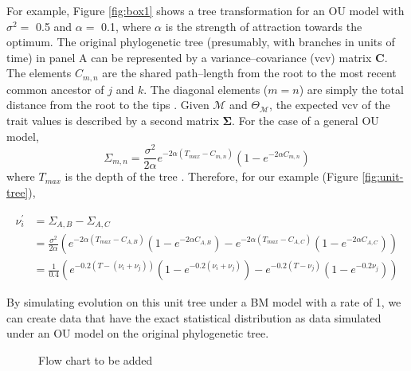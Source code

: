 \documentclass[a4paper,12pt]{article}
\begin{document}
For example, Figure \ref{fig:box1} shows a tree transformation for an OU model with $\sigma^2=$ 0.5 and $\alpha =$ 0.1, where $\alpha$ is the strength of attraction towards the optimum. The original phylogenetic tree (presumably, with branches in units of time) in panel A can be represented by a variance--covariance (vcv) matrix $\mathbf{C}$. The elements $C_{m,n}$ are the shared path--length from the root to the most recent common ancestor of $j$ and $k$. The diagonal elements ($m = n$) are simply the total distance from the root to the tips \citep{Omeara2006}. Given $\mathcal{M}$ and $\Theta_{\mathcal{M}}$, the expected vcv of the trait values is described by a second matrix $\mathbf{\Sigma}$. For the case of a general OU model,
\begin{equation}
\Sigma_{m,n} = \frac{\sigma^2}{2\alpha} e^{-2\alpha (T_{max} - C_{m,n})} (1 - e^{-2\alpha C_{m,n}})
\end{equation} 
where $T_{max}$ is the depth of the tree \citep{Hansen1997, ButlerKing2004}. Therefore, for our example (Figure \ref{fig:unit-tree}), 

\begin{align*}
  \nu_i^\prime &= \Sigma_{A,B} - \Sigma_{A,C}  \\ 
&= \frac{\sigma^2}{2\alpha} \left(e^{-2\alpha (T_{max} - C_{A,B})} (1 -e^{-2\alpha C_{A,B}})
- e^{-2 \alpha (T_{max} - C_{A,C})} (1 - e^{-2\alpha C_{A,C}}) \right)  \\
&= \frac{1}{0.4} \left( e^{-0.2 (T - (\nu_i + \nu_j))} (1 - e^{-0.2 (\nu_i + \nu_j)})
- e^{-0.2 (T - \nu_j)} (1 - e^{-0.2 \nu_j}) \right) 
\end{align*}

By simulating evolution on this unit tree under a BM model with a rate of 1, we can create data that have the exact statistical distribution as data simulated under an OU model on the original phylogenetic tree.


\newpage



\begin{figure}[p]
  \centering
  \caption{Flow chart to be added}
  \label{fig:flowchart}
\end{figure}
\end{document}
